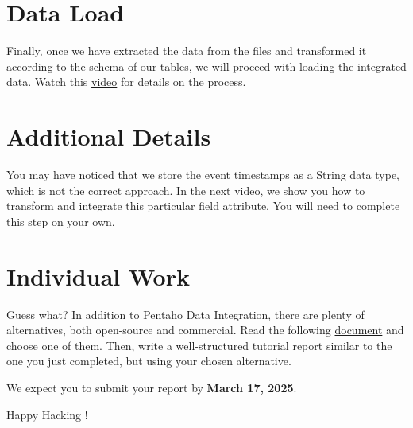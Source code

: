 \documentclass{article}
\begin{document}
\section{Data Load}
Finally, once we have extracted the data from the files and transformed it according to the schema of our tables, we will proceed with loading the integrated data. Watch this \href{https://drive.google.com/file/d/12NCKeYGPp_vZtaxFOrxBwJY1tjRE9eo7/view?usp=drive_link}{video} for details on the process.

\section{Additional Details}
You may have noticed that we store the event timestamps as a String data type, which is not the correct approach. In the next \href{https://drive.google.com/file/d/11d7nMsZtGBEPh7BTEz2RDwHsYFVBr7r4/view?usp=drive_link}{video}, we show you how to transform and integrate this particular field attribute. You will need to complete this step on your own.

\section{Individual Work}
Guess what? In addition to Pentaho Data Integration, there are plenty of alternatives, both open-source and commercial. Read the following \href{https://drive.google.com/file/d/1azz_AAFfquty6bu2YkU9ZqFeTXC2YU0X/view?usp=sharing}{document} and choose one of them. Then, write a well-structured tutorial report similar to the one you just completed, but using your chosen alternative.


We expect you to submit your report by \textbf{March 17, 2025}.

\vspace{5mm}
Happy Hacking \smiley!
\end{document}
